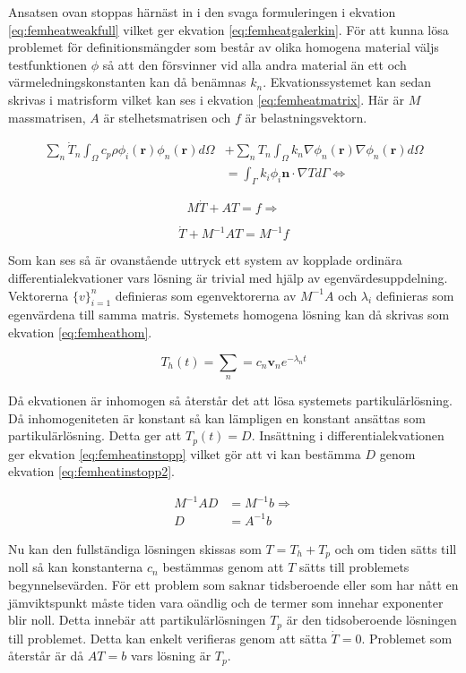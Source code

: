 \noindent
Ansatsen ovan stoppas härnäst in i den svaga formuleringen i ekvation
\eqref{eq:femheatweakfull} vilket ger ekvation \eqref{eq:femheatgalerkin}.
För att kunna lösa problemet för definitionsmängder som består av olika
homogena material väljs testfunktionen $\phi$ så att den försvinner vid
alla andra material än ett och värmeledningskonstanten kan då benämnas $k_n$.
Ekvationssystemet kan sedan skrivas i matrisform vilket kan ses i ekvation
\eqref{eq:femheatmatrix}. Här är $M$ massmatrisen, $A$ är stelhetsmatrisen och
$f$ är belastningsvektorn.

\begin{align}
\label{eq:femheatgalerkin}
\sum_n \dot{T}_n \int_\Omega c_p\rho\phi_i(\mathbf{r})
\phi_n(\mathbf{r})d\Omega
& + \sum_n T_n \int_\Omega k_n \nabla\phi_n(\mathbf{r})\nabla\phi_n(\mathbf{r})
d\Omega \\
&= \int_\Gamma k_i\phi_i\mathbf{n}\cdot\nabla Td\Gamma \Leftrightarrow
\nonumber
\end{align}

\begin{equation}
\label{eq:femheatmatrix}
M\dot{T} + AT = f \Rightarrow
\end{equation}

\begin{equation}
\label{eq:femheatmatrix2}
\dot{T} + M^{-1}AT = M^{-1}f
\end{equation}

\noindent
Som kan ses så är ovanstående uttryck ett system av kopplade ordinära
differentialekvationer vars lösning är trivial med hjälp av egenvärdesuppdelning.
Vektorerna $\{v\}^n_{i=1}$ definieras som egenvektorerna av
$M^{-1}A$ och $\lambda_i$ definieras som egenvärdena till samma matris.
Systemets homogena lösning kan då skrivas som ekvation
\eqref{eq:femheathom}.\cite{lay06}

\begin{equation}
\label{eq:femheathom}
T_h(t) = \sum_n = c_n\mathbf{v}_ne^{-\lambda_nt}
\end{equation}

\noindent
Då ekvationen är inhomogen så återstår det att lösa systemets
partikulärlösning. Då inhomogeniteten är konstant så kan lämpligen
en konstant ansättas som partikulärlösning. Detta ger att
$T_p(t) = D$. Insättning i differentialekvationen ger
ekvation \eqref{eq:femheatinstopp} vilket gör att vi kan bestämma
$D$ genom ekvation \eqref{eq:femheatinstopp2}.

\begin{align}
\label{eq:femheatinstopp}
M^{-1}AD &= M^{-1}b \Rightarrow\\
\label{eq:femheatinstopp2}
D &= A^{-1}b
\end{align}

\noindent
Nu kan den fullständiga lösningen skissas som $T = T_h + T_p$ och om
tiden sätts till noll så kan konstanterna $c_n$ bestämmas genom
att $T$ sätts till problemets begynnelsevärden. För ett problem som
saknar tidsberoende eller som har nått en jämviktspunkt måste
tiden vara oändlig och de termer som innehar exponenter blir noll.
Detta innebär att partikulärlösningen $T_p$ är den tidsoberoende lösningen
till problemet. Detta kan enkelt verifieras genom att sätta $\dot{T} = 0$.
Problemet som återstår är då $AT = b$ vars lösning är $T_p$.
